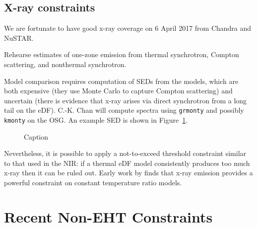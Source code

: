 \documentclass[twocolumn,tighten,dvipsnames]{aastex63}
\newcommand\<{{\langle}}
\renewcommand\>{{\rangle}} %
\begin{document}
\begin{figure*}
  \caption{Left: MAD models, Right: SANE models.  Models marked with a red dot consistently overproduce NIR emission, green dots indicate models that do not overproduce NIR.  The inclination is indicated by the position of the dot, with face-on models near twelve o'clock and edge-on models near three o'clock.}
  \label{fig:NIRmodels}
\end{figure*}

\subsection{X-ray constraints}
\label{sec:xrayconst}

We are fortunate to have good x-ray coverage on 6 April 2017 from Chandra and NuSTAR.

Rehearse estimates of one-zone emission from thermal synchrotron, Compton scattering, and nonthermal synchrotron.

Model comparison requires computation of SEDs from the models, which are both expensive (they use Monte Carlo to capture Compton scattering) and uncertain (there is evidence that x-ray arises via direct synchrotron from a long tail on the eDF).  C.-K. Chan will compute spectra using {\tt grmonty} and possibly {\tt kmonty} on the OSG.  An example SED is shown in Figure~\ref{fig:SEDexamp}.

\begin{figure}
  \caption{Caption}
  \label{fig:SEDexamp}
\end{figure}

Nevertheless, it is possible to apply a not-to-exceed threshold constraint similar to that used in the NIR: if a thermal eDF model consistently produces too much x-ray then it can be ruled out.  Early work by \citet{2009ApJ...706..497M} finds that x-ray emission provides a powerful constraint on constant temperature ratio models.

\section{Recent Non-EHT Constraints}
\label{sec:nonEHT}

\end{document}
